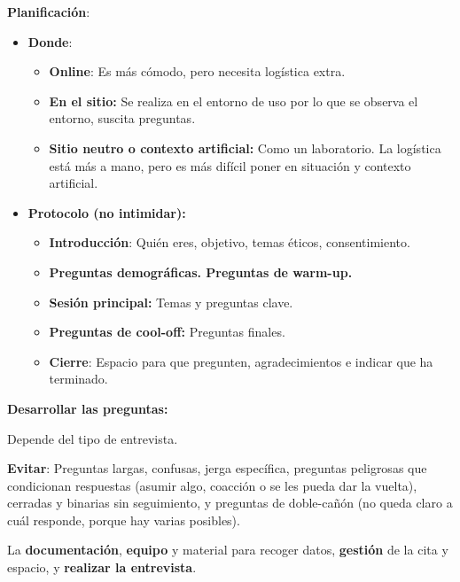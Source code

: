 \documentclass[12pt]{report} %
\begin{document}
\textbf{Planificación}:

\begin{itemize}

\item
  \textbf{Donde}:

  \begin{itemize}
  
  \item
    \textbf{Online}: Es más cómodo, pero necesita logística extra.
    
    \item
      \textbf{En el sitio:} Se realiza en el entorno de uso por lo que
      se observa el entorno, suscita preguntas.
    \item
      \textbf{Sitio neutro o contexto artificial:} Como un laboratorio.
      La logística está más a mano, pero es más difícil poner en
      situación y contexto artificial.
  \end{itemize}
\item
  \textbf{Protocolo (no intimidar):}

  \begin{itemize}
  
  \item
    \textbf{Introducción}: Quién eres, objetivo, temas éticos,
    consentimiento.

    
    \item
      \textbf{Preguntas demográficas. Preguntas de warm-up.}
    \item
      \textbf{Sesión principal:} Temas y preguntas clave.
    \item
      \textbf{Preguntas de cool-off:} Preguntas finales.
    \item
      \textbf{Cierre}: Espacio para que pregunten, agradecimientos e indicar que ha terminado.
  \end{itemize}
\end{itemize}

\textbf{Desarrollar las preguntas:}

Depende del tipo de entrevista.

\textbf{Evitar}: Preguntas largas, confusas, jerga específica, preguntas
peligrosas que condicionan respuestas (asumir algo, coacción o se les
pueda dar la vuelta), cerradas y binarias sin seguimiento, y preguntas
de doble-cañón (no queda claro a cuál responde, porque hay varias
posibles).

La \textbf{documentación}, \textbf{equipo} y material para recoger
datos, \textbf{gestión} de la cita y espacio, y \textbf{realizar la
entrevista}.
\end{document}
